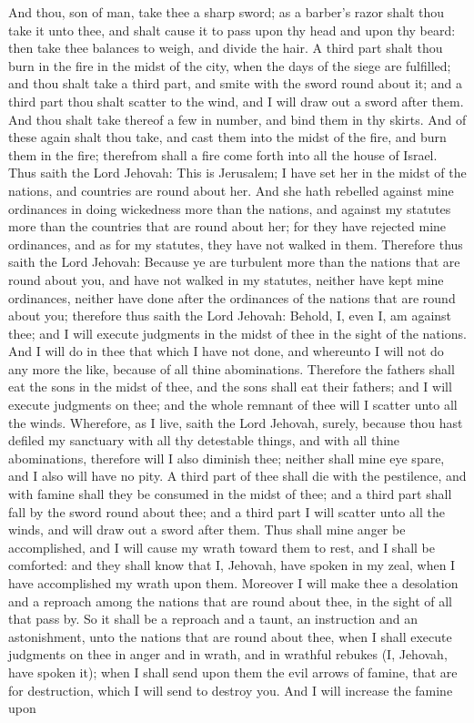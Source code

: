 And thou, son of man, take thee a sharp sword; as a barber’s razor shalt thou take it unto thee, and shalt cause it to pass upon thy head and upon thy beard: then take thee balances to weigh, and divide the hair. A third part shalt thou burn in the fire in the midst of the city, when the days of the siege are fulfilled; and thou shalt take a third part, and smite with the sword round about it; and a third part thou shalt scatter to the wind, and I will draw out a sword after them. And thou shalt take thereof a few in number, and bind them in thy skirts. And of these again shalt thou take, and cast them into the midst of the fire, and burn them in the fire; therefrom shall a fire come forth into all the house of Israel.  Thus saith the Lord Jehovah: This is Jerusalem; I have set her in the midst of the nations, and countries are round about her. And she hath rebelled against mine ordinances in doing wickedness more than the nations, and against my statutes more than the countries that are round about her; for they have rejected mine ordinances, and as for my statutes, they have not walked in them. Therefore thus saith the Lord Jehovah: Because ye are turbulent more than the nations that are round about you, and have not walked in my statutes, neither have kept mine ordinances, neither have done after the ordinances of the nations that are round about you; therefore thus saith the Lord Jehovah: Behold, I, even I, am against thee; and I will execute judgments in the midst of thee in the sight of the nations. And I will do in thee that which I have not done, and whereunto I will not do any more the like, because of all thine abominations. Therefore the fathers shall eat the sons in the midst of thee, and the sons shall eat their fathers; and I will execute judgments on thee; and the whole remnant of thee will I scatter unto all the winds. Wherefore, as I live, saith the Lord Jehovah, surely, because thou hast defiled my sanctuary with all thy detestable things, and with all thine abominations, therefore will I also diminish thee; neither shall mine eye spare, and I also will have no pity. A third part of thee shall die with the pestilence, and with famine shall they be consumed in the midst of thee; and a third part shall fall by the sword round about thee; and a third part I will scatter unto all the winds, and will draw out a sword after them.  Thus shall mine anger be accomplished, and I will cause my wrath toward them to rest, and I shall be comforted: and they shall know that I, Jehovah, have spoken in my zeal, when I have accomplished my wrath upon them. Moreover I will make thee a desolation and a reproach among the nations that are round about thee, in the sight of all that pass by. So it shall be a reproach and a taunt, an instruction and an astonishment, unto the nations that are round about thee, when I shall execute judgments on thee in anger and in wrath, and in wrathful rebukes (I, Jehovah, have spoken it); when I shall send upon them the evil arrows of famine, that are for destruction, which I will send to destroy you. And I will increase the famine upon 